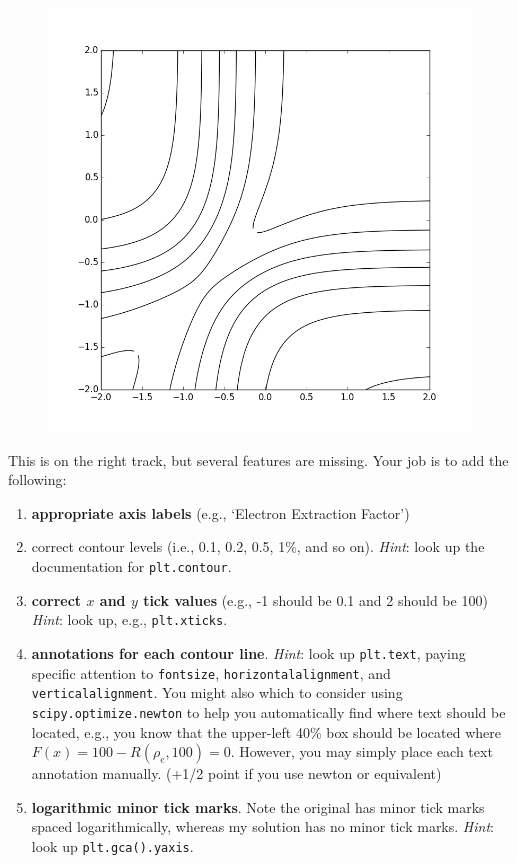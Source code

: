\documentclass[11pt]{article}
\begin{document}
\begin{figure}[ht]
    \centering
    \includegraphics[keepaspectratio, width = 3.0 in]
                    {new_contour}
\end{figure}

This is on the right track, but several features are missing.  Your job
is to add the following:
\begin{enumerate}
 \item {\bf appropriate axis labels} (e.g., `Electron Extraction Factor')
 \item correct contour levels (i.e., 0.1, 0.2, 0.5, 1\%, and so on).
       {\it Hint}: look up the documentation for {\tt plt.contour}.
 \item {\bf correct $x$  and $y$ tick values} (e.g., -1 should be 0.1 and 2
       should be 100) {\it Hint}: look up, e.g., {\tt plt.xticks}.
 \item {\bf annotations for each contour line}. {\it Hint}: look up 
       {\tt plt.text}, paying specific attention to {\tt fontsize},
       {\tt horizontalalignment}, and {\tt verticalalignment}. 
       You might also which to consider using {\tt scipy.optimize.newton}
       to help you automatically find where text should be located,
       e.g., you know that the upper-left 40\% box should be located where 
       $F(x) = 100 - R(\rho_e, 100) = 0$.  However, you may simply
       place each text annotation manually.  (+1/2 point if you use newton or equivalent)
 \item {\bf logarithmic minor tick marks}.   Note the 
       original has minor tick marks spaced logarithmically, whereas
       my solution has no minor tick marks.  {\it Hint}: look 
       up {\tt plt.gca().yaxis}.
\end{enumerate}
\end{document}

